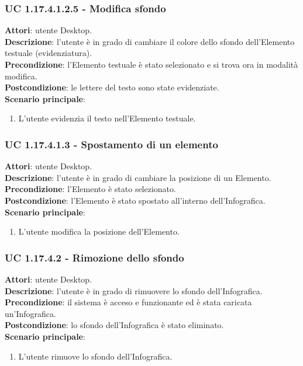 \subsubsection{UC 1.17.4.1.2.5 - Modifica sfondo}{
	\label{uc1.17.4.1.2.5}
	\textbf{Attori}: utente Desktop. \\
	\textbf{Descrizione}: l'utente è in grado di cambiare il colore dello sfondo dell’Elemento testuale (evidenziatura). \\
	\textbf{Precondizione}: l'Elemento testuale è stato selezionato e si trova ora in modalità modifica.\\
	\textbf{Postcondizione}: le lettere del testo sono state evidenziate.\\
	\textbf{Scenario principale}:
	\begin{enumerate}
		\item L'utente evidenzia il testo nell’Elemento testuale.
	\end{enumerate}			
	}
\subsubsection{UC 1.17.4.1.3 - Spostamento di un elemento}{
	\label{uc1.17.4.1.3}
	\textbf{Attori}: utente Desktop. \\
	\textbf{Descrizione}: l'utente è in grado di cambiare la posizione di un Elemento. \\
	\textbf{Precondizione}: l'Elemento è stato selezionato.\\
	\textbf{Postcondizione}: l'Elemento è stato spostato all’interno dell’Infografica.\\
	\textbf{Scenario principale}:
	\begin{enumerate}
		\item L'utente modifica la posizione dell'Elemento.
	\end{enumerate}			
	}
\subsubsection{UC 1.17.4.2 - Rimozione dello sfondo}{
	\label{uc1.17.4.2}
	\textbf{Attori}: utente Desktop. \\
	\textbf{Descrizione}: l'utente è in grado di rimuovere lo sfondo dell’Infografica. \\
	\textbf{Precondizione}: il sistema è acceso e funzionante ed è stata caricata un'Infografica.	\\
	\textbf{Postcondizione}: lo sfondo dell'Infografica è stato eliminato.\\
	\textbf{Scenario principale}:
	\begin{enumerate}
		\item L'utente rimuove lo sfondo dell'Infografica.
	\end{enumerate}			
	}
